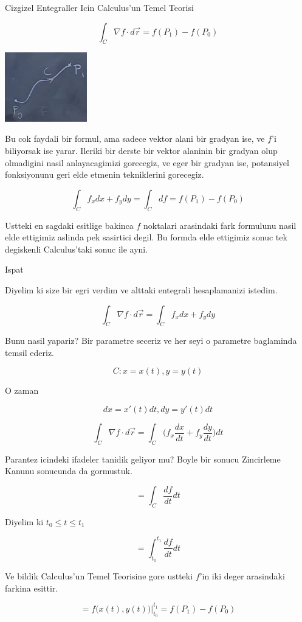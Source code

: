 \documentclass[12pt,fleqn]{article}\usepackage{../common}
\begin{document}
Cizgizel Entegraller Icin Calculus'un Temel Teorisi

\[ \int_{C} \nabla f \cdot d\vec{r} = 
f(P_1) - f(P_0)
 \]

\includegraphics[height=3cm]{20_5.png}

Bu cok faydali bir formul, ama sadece vektor alani bir gradyan ise, ve
$f$'i biliyorsak ise yarar. Ileriki bir derste bir vektor alaninin bir
gradyan olup olmadigini nasil anlayacagimizi gorecegiz, ve eger bir gradyan
ise, potansiyel fonksiyonunu geri elde etmenin tekniklerini gorecegiz. 

\[ \int_C f_x dx + f_y dy  = \int_C df = f(P_1) - f(P_0) \]


Ustteki en sagdaki esitlige bakinca $f$ noktalari arasindaki fark formulunu
nasil elde ettigimiz aslinda pek sasirtici degil. Bu formda elde ettigimiz
sonuc tek degiskenli Calculus'taki sonuc ile ayni. 

Ispat

Diyelim ki size bir egri verdim ve alttaki entegrali hesaplamanizi
istedim. 

\[ \int_{C} \nabla f \cdot d\vec{r} =  \int_C f_x dx + f_y dy
 \]

Bunu nasil yapariz? Bir parametre seceriz ve her seyi o parametre
baglaminda temsil ederiz. 

\[ C: x = x(t), y = y(t) \]

O zaman 

\[ dx = x'(t)dt, dy = y'(t)dt \]

\[ \int_{C} \nabla f \cdot d\vec{r} =  
\int_C \bigg( f_x \frac{dx}{dt} + f_y \frac{dy}{dt} \bigg) dt
\]

Parantez icindeki ifadeler tanidik geliyor mu? Boyle bir sonucu Zincirleme
Kanunu sonucunda da gormustuk. 

\[ = \int_C \frac{df}{dt} dt\]

Diyelim ki $t_0 \le t \le t_1$

\[ = \int_{t_0}^{t_1} \frac{df}{dt} dt\]

Ve bildik Calculus'un Temel Teorisine gore ustteki $f$'in iki deger
arasindaki farkina esittir. 

\[ = f\bigg( x(t), y(t) \bigg) \bigg|_{t_0}^{t_1} =
f(P_1) - f(P_0)
\]
\end{document}
